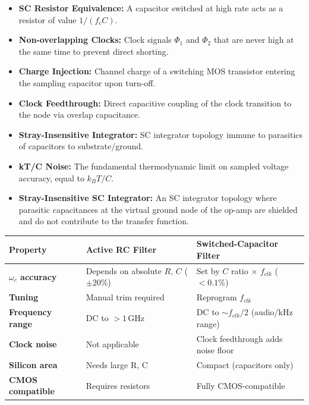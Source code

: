 \documentclass[12pt,a4paper]{article}
\renewcommand{\arraystretch}{1.45}
\begin{document}
\begin{tcolorbox}[defbox, title={\textbf{One-Line Definitions}}]
\begin{itemize}[leftmargin=*, itemsep=2pt, topsep=0pt]
  \item \textbf{SC Resistor Equivalence:} A capacitor switched at high rate acts as a resistor of value $1/(f_c C)$.
  \item \textbf{Non-overlapping Clocks:} Clock signals $\Phi_1$ and $\Phi_2$ that are never high at the same time to prevent direct shorting.
  \item \textbf{Charge Injection:} Channel charge of a switching MOS transistor entering the sampling capacitor upon turn-off.
  \item \textbf{Clock Feedthrough:} Direct capacitive coupling of the clock transition to the node via overlap capacitance.
  \item \textbf{Stray-Insensitive Integrator:} SC integrator topology immune to parasitics of capacitors to substrate/ground.
  \item \textbf{kT/C Noise:} The fundamental thermodynamic limit on sampled voltage accuracy, equal to $k_B T / C$.
  \item \textbf{Stray-Insensitive SC Integrator:} An SC integrator topology where parasitic capacitances at the virtual ground node of the op-amp are shielded and do not contribute to the transfer function.
\end{itemize}
\end{tcolorbox}

\begin{tcolorbox}[tikzbox, title={\textbf{Continuous-Time vs.~Switched-Capacitor Filter Comparison}}]
\centering
\par\noindent
\renewcommand{\arraystretch}{1.3}
\begin{tabularx}{\linewidth}{|B{2.8cm}|Y|Y|}
\hline
\textbf{Property} & \textbf{Active RC Filter} & \textbf{Switched-Capacitor Filter} \\ \hline
\textbf{$\omega_c$ accuracy} & Depends on absolute $R$, $C$ ($\pm20\%$) & Set by $C$ ratio $\times$ $f_{clk}$ ($<0.1\%$) \\ \hline
\textbf{Tuning} & Manual trim required & Reprogram $f_{clk}$ \\ \hline
\textbf{Frequency range} & DC to $>1\,$GHz & DC to $\sim f_{clk}/2$ (audio/kHz range) \\ \hline
\textbf{Clock noise} & Not applicable & Clock feedthrough adds noise floor \\ \hline
\textbf{Silicon area} & Needs large R, C & Compact (capacitors only) \\ \hline
\textbf{CMOS compatible} & Requires resistors & Fully CMOS-compatible \\ \hline
\end{tabularx}
\end{tcolorbox}
\end{document}
